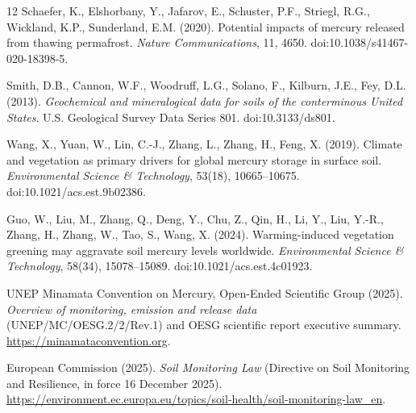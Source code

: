 \documentclass[11pt]{article}
\begin{document}
\begin{thebibliography}{12}
Schaefer, K., Elshorbany, Y., Jafarov, E., Schuster, P.F., Striegl, R.G.,
Wickland, K.P., Sunderland, E.M. (2020). Potential impacts of mercury
released from thawing permafrost. \emph{Nature Communications}, 11, 4650.
doi:10.1038/s41467-020-18398-5.

Smith, D.B., Cannon, W.F., Woodruff, L.G., Solano, F., Kilburn, J.E., Fey,
D.L. (2013). \emph{Geochemical and mineralogical data for soils of the
conterminous United States}. U.S. Geological Survey Data Series 801.
doi:10.3133/ds801.

Wang, X., Yuan, W., Lin, C.-J., Zhang, L., Zhang, H., Feng, X. (2019).
Climate and vegetation as primary drivers for global mercury storage in
surface soil. \emph{Environmental Science \& Technology}, 53(18),
10665--10675. doi:10.1021/acs.est.9b02386.

Guo, W., Liu, M., Zhang, Q., Deng, Y., Chu, Z., Qin, H., Li, Y., Liu, Y.-R.,
Zhang, H., Zhang, W., Tao, S., Wang, X. (2024). Warming-induced vegetation
greening may aggravate soil mercury levels worldwide. \emph{Environmental
Science \& Technology}, 58(34), 15078--15089. doi:10.1021/acs.est.4c01923.

UNEP Minamata Convention on Mercury, Open-Ended Scientific Group (2025).
\emph{Overview of monitoring, emission and release data}
(UNEP/MC/OESG.2/2/Rev.1) and OESG scientific report executive summary.
\url{https://minamataconvention.org}.

European Commission (2025). \emph{Soil Monitoring Law} (Directive on Soil
Monitoring and Resilience, in force 16 December 2025).
\url{https://environment.ec.europa.eu/topics/soil-health/soil-monitoring-law_en}.
\end{thebibliography}
\end{document}
